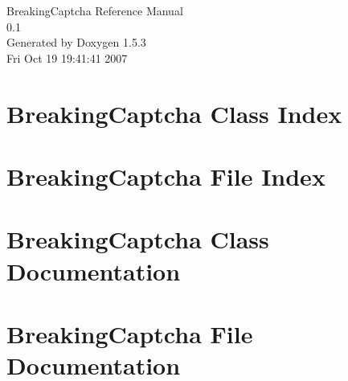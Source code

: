 \documentclass[a4paper]{book}
\begin{document}
\begin{titlepage}
\vspace*{7cm}
\begin{center}
{\Large BreakingCaptcha Reference Manual\\[1ex]\large 0.1 }\\
\vspace*{1cm}
{\large Generated by Doxygen 1.5.3}\\
\vspace*{0.5cm}
{\small Fri Oct 19 19:41:41 2007}\\
\end{center}
\end{titlepage}
\clearemptydoublepage
{}
\tableofcontents
\clearemptydoublepage
{}
\chapter{BreakingCaptcha Class Index}

\chapter{BreakingCaptcha File Index}

\chapter{BreakingCaptcha Class Documentation}



\chapter{BreakingCaptcha File Documentation}






\printindex
\end{document}
